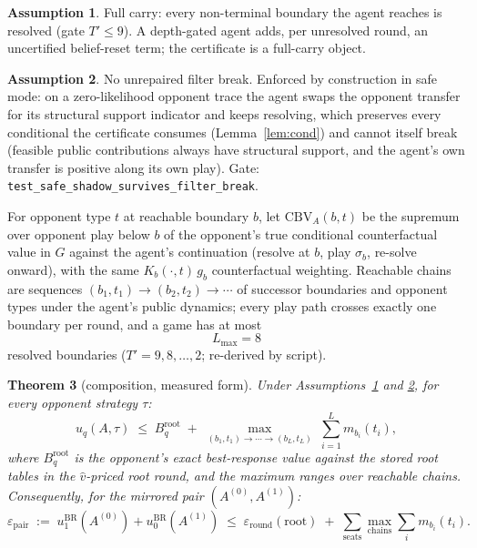 \documentclass[11pt]{article}
\theoremstyle{plain}
\newtheorem{theorem}{Theorem}[section]
\theoremstyle{definition}
\newtheorem{assumption}[theorem]{Assumption}
\theoremstyle{remark}
\newcommand{\CBV}{\mathrm{CBV}}
\newcommand{\pathmax}[1]{\max_{#1}}
\begin{document}
\begin{assumption}\label{ass:full}
Full carry: every non-terminal boundary the agent reaches is resolved
(gate $T'\le 9$). A depth-gated agent adds, per unresolved round, an
uncertified belief-reset term; the certificate is a full-carry object.
\end{assumption}

\begin{assumption}\label{ass:break}
No unrepaired filter break. Enforced by construction in safe mode: on
a zero-likelihood opponent trace the agent swaps the opponent
transfer for its structural support indicator and keeps resolving,
which preserves every conditional the certificate consumes
(Lemma~\ref{lem:cond}) and cannot itself break (feasible public
contributions always have structural support, and the agent's own
transfer is positive along its own play). Gate:
\texttt{test\_safe\_shadow\_survives\_filter\_break}.
\end{assumption}

For opponent type $t$ at reachable boundary $b$, let $\CBV_A(b,t)$ be
the supremum over opponent play below $b$ of the opponent's true
conditional counterfactual value in $G$ against the agent's
continuation (resolve at $b$, play $\sigma_b$, re-solve onward), with
the same $K_b(\cdot,t)\,g_b$ counterfactual weighting. Reachable
chains are sequences $(b_1,t_1) \to (b_2,t_2) \to \cdots$ of
successor boundaries and opponent types under the agent's public
dynamics; every play path crosses exactly one boundary per round, and
a game has at most
\[
L_{\max} = 8
\]
resolved boundaries ($T' = 9, 8, \ldots, 2$; re-derived by script).

\begin{theorem}[composition, measured form]\label{thm:comp}
Under Assumptions~\ref{ass:full} and \ref{ass:break}, for every
opponent strategy $\tau$:
\[
u_q(A, \tau) \;\le\; B^{\mathrm{root}}_q \;+\;
\pathmax{(b_1,t_1)\to\cdots\to(b_L,t_L)} \;\sum_{i=1}^{L} m_{b_i}(t_i),
\]
where $B^{\mathrm{root}}_q$ is the opponent's exact best-response
value against the stored root tables in the $\hat v$-priced root
round, and the maximum ranges over reachable chains. Consequently,
for the mirrored pair $(A^{(0)}, A^{(1)})$:
\[
\varepsilon_{\mathrm{pair}} \;:=\; u^{\mathrm{BR}}_1(A^{(0)}) + u^{\mathrm{BR}}_0(A^{(1)})
\;\le\; \varepsilon_{\mathrm{round}}(\mathrm{root}) \;+\;
\sum_{\text{seats}} \pathmax{\text{chains}} \sum_i m_{b_i}(t_i).
\]
\end{theorem}
\end{document}
